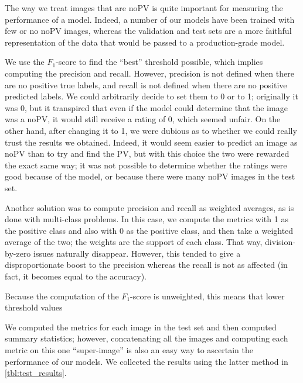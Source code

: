 \documentclass[10pt,conference]{IEEEtran}
\begin{document}
The way we treat images that are noPV is quite important for
measuring the performance of a model.
Indeed, a number of our models have been trained with few or no
noPV images, whereas the validation and test sets are a more
faithful representation of the data that would be passed to a
production-grade model.

We use the $F_1$-score to find the ``best'' threshold possible, which implies computing the precision and recall.
However, precision is not defined when there are no positive true labels,
and recall is not defined when there are no positive predicted labels.
We could arbitrarily decide to set them to 0 or to 1;
originally it was 0, but it transpired that even if
the model could determine that the image was a noPV, it
would still receive a rating of 0, which seemed unfair.
On the other hand, after changing it to 1, we were
dubious as to whether we could really trust the results
we obtained. Indeed, it would seem easier to predict an
image as noPV than to try and find the PV, but with this
choice the two were rewarded the exact same way; it was
not possible to determine whether the ratings were
good because of the model, or because there were many
noPV images in the test set.

Another solution was to compute precision and recall
as weighted averages, as is done with multi-class
problems. In this case, we compute the metrics 
with 1 as the positive class and also with 0 as the
positive class, and then take a weighted average of
the two; the weights are the support of each class.
That way, division-by-zero issues naturally disappear.
However, this tended to give a disproportionate
boost to the precision whereas the recall is not as
affected (in fact, it becomes equal to the accuracy).

Because the computation of the $F_1$-score is unweighted,
this means that lower threshold values

We computed the metrics for each image in the test set and then computed summary statistics;
however, concatenating all the images and computing each
metric on this one ``super-image'' is also an easy
way to ascertain the performance of our models.
We collected the results using the latter method in
\autoref{tbl:test_results}.

\end{document}
